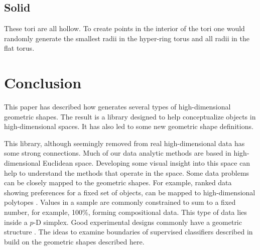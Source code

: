 


\subsection{Solid}  %

These tori are all hollow. To create points in the interior of the
tori one would randomly generate the smallest radii in the hyper-ring torus and all radii in the flat torus.

\section{Conclusion}

This paper has described how  generates several types of
high-dimensional geometric shapes. The result is a library designed to
help conceptualize objects in high-dimensional spaces. It has also led to some
new geometric shape definitions.

This library, although seemingly removed from real high-dimensional
data has some strong connections. Much of our data analytic methods
are based in high-dimensional Euclidean space. Developing some visual
insight into this space can help to understand the methods that
operate in the space. Some data problems can be closely mapped to the geometric
shapes. For example, ranked data showing preferences for a fixed set
of objects, can be mapped to high-dimensional polytopes \citep{Th93}.
Values in a sample are commonly constrained to sum to a fixed number,
for example, 100\%, forming compositional data. This type of data lies
inside a $p$-D simplex. Good experimental designs commonly have a
geometric structure \citep{HSS99}. The ideas to examine boundaries of supervised classifiers described in \citet{CCWH08} build on the geometric shapes described here.

